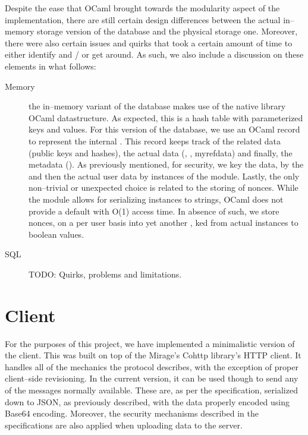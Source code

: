 Despite the ease that OCaml brought towards the modularity aspect of the implementation, there are still certain design differences between the actual in--memory storage version of the database and the physical storage one.
Moreover, there were also certain issues and quirks that took a certain amount of time to either identify and / or get around.
As such, we also include a discussion on these elements in what follows:
\begin{description}
  \item[Memory] the in--memory variant of the database makes use of the native library OCaml  datastructure.
  As expected, this is a hash table with parameterized keys and values.
  For this version of the database, we use an OCaml record to represent the internal .
  This record keeps track of the  related data (public keys and hashes), the actual data (, , myref{data}) and finally, the metadata ().
  As previously mentioned, for security, we key the  data, by the  and then the actual user data by instances of the  module.
  Lastly, the only non--trivial or unexpected choice is related to the storing of nonces.
  While the  module allows for serializing instances to strings, OCaml does not provide a default  with O(1) access time.
  In absence of such, we store nonces, on a per user basis into yet another , ked from actual  instances to boolean values.
  \item[SQL] TODO: Quirks, problems and limitations.
\end{description}

\section{Client}
For the purposes of this project, we have implemented a minimalistic version of the client.
This was built on top of the Mirage's Cohttp library's HTTP client.
It handles all of the mechanics the protocol describes, with the exception of proper client--side revisioning.
In the current version, it can be used though to send any of the messages normally available.
These are, as per the specification, serialized down to JSON, as previously described, with the data properly encoded using Base64 encoding.
Moreover, the security mechanisms described in the specifications are also applied when uploading data to the server.

